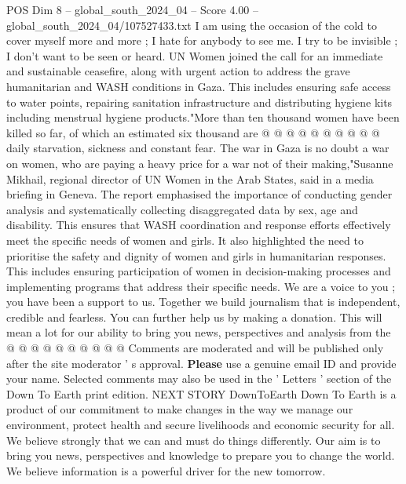 \begin{textsample}{POS Dim 8 – global\_south\_2024\_04 – Score 4.00 – global\_south\_2024\_04/107527433.txt}
I am using the occasion of the cold to cover myself more and more ; I hate for anybody to see me.
I try to be invisible ; I don't want to be seen or heard.
UN Women joined the call for an immediate and sustainable ceasefire, along with urgent action to address the grave humanitarian and WASH conditions in Gaza.
This includes ensuring safe access to water points, repairing sanitation infrastructure and distributing hygiene kits including menstrual hygiene products."More than ten thousand women have been killed so far, of which an estimated six thousand are @ @ @ @ @ @ @ @ @ @ daily starvation, sickness and constant fear.
The war in Gaza is no doubt a war on women, who are paying a heavy price for a war not of their making,"Susanne Mikhail, regional director of UN Women in the Arab States, said in a media briefing in Geneva.
The report emphasised the importance of conducting gender analysis and systematically collecting disaggregated data by sex, age and disability.
This ensures that WASH coordination and response efforts effectively meet the specific needs of women and girls.
It also highlighted the need to prioritise the safety and dignity of women and girls in humanitarian responses.
This includes ensuring participation of women in decision-making processes and implementing programs that address their specific needs.
We are a voice to you ; you have been a support to us.
Together we build journalism that is independent, credible and fearless.
You can further help us by making a donation.
This will mean a lot for our ability to bring you news, perspectives and analysis from the @ @ @ @ @ @ @ @ @ @ Comments are moderated and will be published only after the site moderator ' s approval. \textbf{Please} use a genuine email ID and provide your name.
Selected comments may also be used in the ' Letters ' section of the Down To Earth print edition.
NEXT STORY DownToEarth Down To Earth is a product of our commitment to make changes in the way we manage our environment, protect health and secure livelihoods and economic security for all.
We believe strongly that we can and must do things differently.
Our aim is to bring you news, perspectives and knowledge to prepare you to change the world.
We believe information is a powerful driver for the new tomorrow.

\end{textsample}
